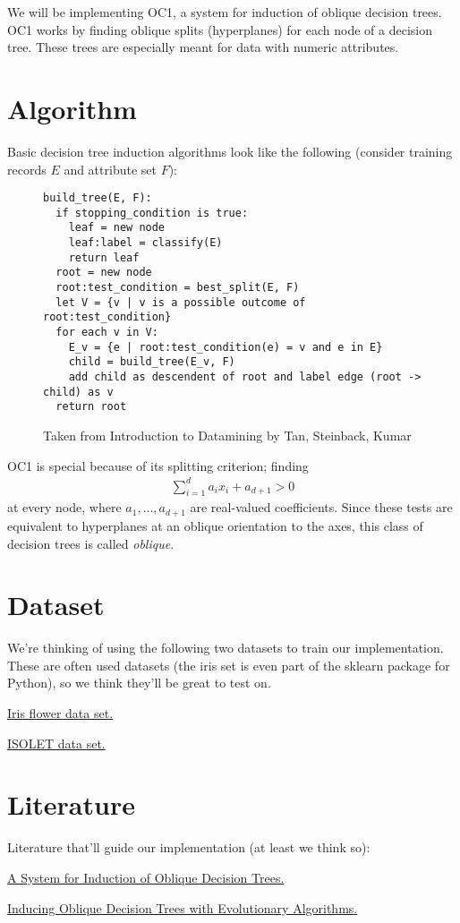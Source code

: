\documentclass{article}
\begin{document}
We will be implementing OC1, a system for induction of oblique decision trees. OC1 works by finding oblique splits (hyperplanes) for each node of a decision tree. These trees are especially meant for data with numeric attributes.

\section*{Algorithm}
Basic decision tree induction algorithms look like the following (consider training records $E$ and attribute set $F$):
\begin{figure}[h!]
\begin{lstlisting}[frame=single]
build_tree(E, F):
  if stopping_condition is true:
    leaf = new node
    leaf:label = classify(E)
    return leaf
  root = new node
  root:test_condition = best_split(E, F)
  let V = {v | v is a possible outcome of root:test_condition}
  for each v in V:
    E_v = {e | root:test_condition(e) = v and e in E}
    child = build_tree(E_v, F)
    add child as descendent of root and label edge (root -> child) as v
  return root
\end{lstlisting}
\caption{Taken from Introduction to Datamining by Tan, Steinback, Kumar}
\end{figure}

OC1 is special because of its splitting criterion; finding
\begin{align*}
\sum\limits_{i=1}^{d}a_i x_i + a_{d+1} > 0
\end{align*}
at every node, where $a_1, \ldots, a_{d+1}$ are real-valued coefficients. Since these tests are equivalent to hyperplanes at an oblique orientation to the axes, this class of decision trees is called \emph{oblique}.

\section*{Dataset}
We're thinking of using the following two datasets to train our implementation. These are often used datasets (the iris set is even part of the sklearn package for Python), so we think they'll be great to test on.

\href{http://en.wikipedia.org/wiki/Iris\_flower\_data\_set}{Iris flower data set.}

\href{https://archive.ics.uci.edu/ml/datasets/ISOLET}{ISOLET data set.}

\section*{Literature}
Literature that'll guide our implementation (at least we think so):

\href{http://www.jair.org/media/63/live-63-1401-jair.pdf}{A System for Induction of Oblique Decision Trees.}

\href{http://sci2s.ugr.es/keel/pdf/algorithm/articulo/Oblique-DT.pdf}{Inducing Oblique Decision Trees with Evolutionary Algorithms.}
\end{document}
